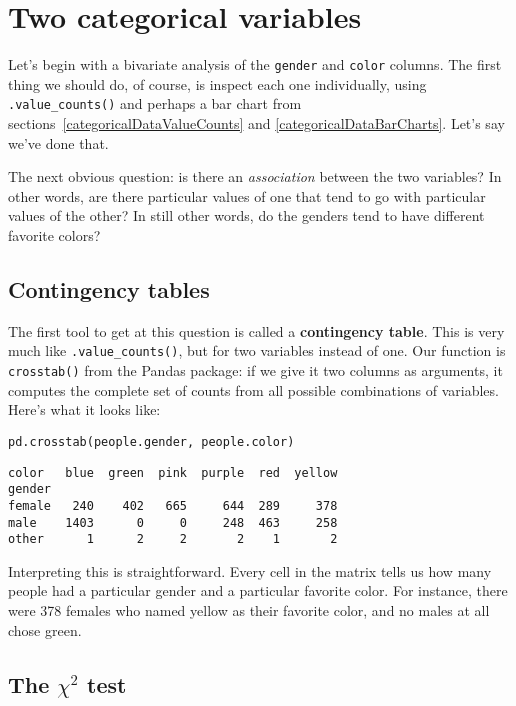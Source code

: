 \section{Two categorical variables}


Let's begin with a bivariate analysis of the \texttt{gender} and \texttt{color}
columns. The first thing we should do, of course, is inspect each one
individually, using \texttt{.value\_counts()} and perhaps a bar chart from
sections~\ref{categoricalDataValueCounts} and \ref{categoricalDataBarCharts}.
Let's say we've done that.


The next obvious question: is there an \textit{association} between the two
variables? In other words, are there particular values of one that tend to go
with particular values of the other? In still other words, do the genders tend
to have different favorite colors?


\subsection{Contingency tables}

The first tool to get at this question is called a \textbf{contingency table}.
This is very much like \texttt{.value\_counts()}, but for two variables instead
of one. Our function is \texttt{crosstab()} from the Pandas package: if we give
it two columns as arguments, it computes the complete set of counts from all
possible combinations of variables. Here's what it looks like:

\begin{Verbatim}[fontsize=\small,samepage=true,frame=single,framesep=3mm]
pd.crosstab(people.gender, people.color)
\end{Verbatim}
\vspace{-.2in}

\begin{Verbatim}[fontsize=\small,samepage=true,frame=leftline,framesep=5mm,framerule=1mm]
color   blue  green  pink  purple  red  yellow
gender                                        
female   240    402   665     644  289     378
male    1403      0     0     248  463     258
other      1      2     2       2    1       2
\end{Verbatim}

Interpreting this is straightforward. Every cell in the matrix tells us how
many people had a particular gender and a particular favorite color. For
instance, there were 378 females who named yellow as their favorite color, and
no males at all chose green.


\subsection{The $\chi^2$ test}

